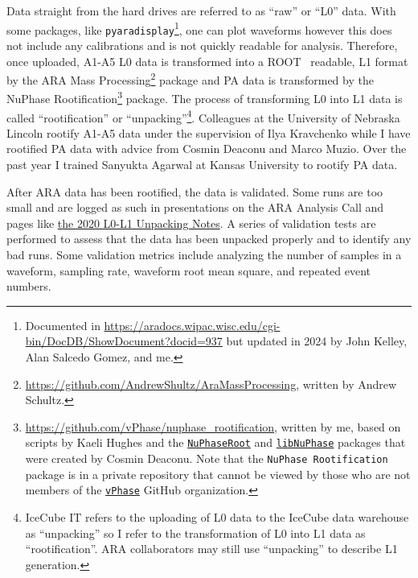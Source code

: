         Data straight from the hard drives are referred to as ``raw'' or ``L0'' data. 
        With some packages, like \texttt{pyaradisplay}\footnote{Documented in \href{https://aradocs.wipac.wisc.edu/cgi-bin/DocDB/ShowDocument?docid=937}{https://aradocs.wipac.wisc.edu/cgi-bin/DocDB/ShowDocument?docid=937} but updated in 2024 by John Kelley, Alan Salcedo Gomez, and me.}, one can plot waveforms however this does not include any calibrations and is not quickly readable for analysis.
        Therefore, once uploaded, A1-A5 L0 data is transformed into a ROOT~\citep{root} readable, L1 format by the ARA Mass Processing\footnote{
          \href{https://github.com/AndrewShultz/AraMassProcessing}{https://github.com/AndrewShultz/AraMassProcessing}, written by Andrew Schultz.
        } package and PA data is transformed by the NuPhase Rootification\footnote{
          \href{https://github.com/vPhase/nuphase_rootification}{https://github.com/vPhase/nuphase\_rootification}, written by me, based on scripts by Kaeli Hughes and the \href{https://github.com/vPhase/nuphaseroot}{\texttt{NuPhaseRoot}} and \href{https://github.com/vPhase/libnuphase}{\texttt{libNuPhase}} packages that were created by Cosmin Deaconu. 
          Note that the \texttt{NuPhase Rootification} package is in a private repository that cannot be viewed by those who are not members of the \href{https://github.com/vPhase}{\texttt{vPhase}} GitHub organization.
        } package.
        The process of transforming L0 into L1 data is called ``rootification'' or ``unpacking''\footnote{IceCube IT refers to the uploading of L0 data to the IceCube data warehouse as ``unpacking'' so I refer to the transformation of L0 into L1 data as ``rootification''. ARA collaborators may still use ``unpacking'' to describe L1 generation.}. 
        Colleagues at the University of Nebraska Lincoln rootify A1-A5 data under the supervision of Ilya Kravchenko while I have rootified PA data with advice from Cosmin Deaconu and Marco Muzio. 
        Over the past year I trained Sanyukta Agarwal at Kansas University to rootify PA data. 

        After ARA data has been rootified, the data is validated. 
        Some runs are too small and are logged as such in presentations on the ARA Analysis Call and pages like \href{https://mediawiki.icecube.wisc.edu/ara/index.php/2020_L0-L1_Unpacking_Notes}{the 2020 L0-L1 Unpacking Notes}. 
        A series of validation tests are performed to assess that the data has been unpacked properly and to identify any bad runs. 
        Some validation metrics include analyzing the number of samples in a waveform, sampling rate, waveform root mean square, and repeated event numbers.
        
